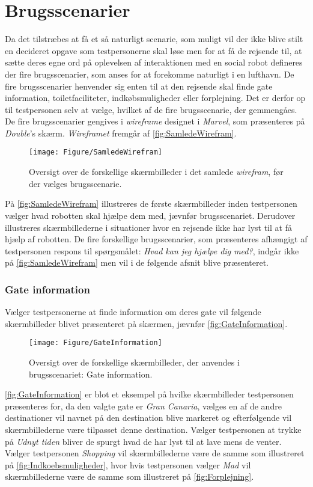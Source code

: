 \section{Brugsscenarier}
\label{ParametreBrugsscenarier}
%
Da det tilstræbes at få et så naturligt scenarie, som muligt vil der ikke blive stilt en decideret opgave som testpersonerne skal løse men for at få de rejsende til, at sætte deres egne ord på oplevelsen af interaktionen med en social robot defineres der fire brugsscenarier, som anses for at forekomme naturligt i en lufthavn. De fire brugsscenarier henvender sig enten til at den rejsende skal finde gate information, toiletfaciliteter, indkøbsmuligheder eller forplejning. Det er derfor op til testpersonen selv at vælge, hvilket af de fire brugsscenarie, der gemmengåes. De fire brugsscenarier gengives i \textit{wireframe} designet i \textit{Marvel}, som præsenteres på \textit{Double}'s skærm. \textit{Wireframet} fremgår af \autoref{fig:SamledeWirefram}.
%
\begin{figure}[H]
\centering
\texttt{[image: Figure/SamledeWirefram]} 
\caption{Oversigt over de forskellige skærmbilleder i det samlede \textit{wirefram}, før der vælges brugsscenarie.}
\label{fig:SamledeWirefram}
\end{figure}
\noindent
%
På \autoref{fig:SamledeWirefram} illustreres de første skærmbilleder inden testpersonen vælger hvad robotten skal hjælpe dem med, jævnfør brugsscenariet. Derudover illustreres skærmbillederne i situationer hvor en rejsende ikke har lyst til at få hjælp af robotten. De fire forskellige brugsscenarier, som præsenteres afhængigt af testpersonen respons til spørgsmålet: \textit{Hvad kan jeg hjælpe dig med?}, indgår ikke på \autoref{fig:SamledeWirefram} men vil i de følgende afsnit blive præsenteret. 
  

\subsubsection*{Gate information}
%
Vælger testpersonerne at finde information om deres gate vil følgende skærmbilleder blivet præsenteret på skærmen, jævnfør \autoref{fig:GateInformation}. 
%
\begin{figure}[H]
\centering
\texttt{[image: Figure/GateInformation]} 
\caption{Oversigt over de forskellige skærmbilleder, der anvendes i brugsscenariet: Gate information.}
\label{fig:GateInformation}
\end{figure}
\noindent
%
\autoref{fig:GateInformation} er blot et eksempel på hvilke skærmbilleder testpersonen præsenteres for, da den valgte gate er \textit{Gran Canaria}, vælges en af de andre destinationer vil navnet på den destination blive markeret og efterfølgende vil skærmbillederne være tilpasset denne destination. Vælger testpersonen at trykke på \textit{Udnyt tiden} bliver de spurgt hvad de har lyst til at lave mens de venter. Vælger testpersonen \textit{Shopping} vil skærmbillederne være de samme som illustreret på \autoref{fig:Indkoebsmuligheder}, hvor hvis testpersonen vælger \textit{Mad} vil skærmbillederne være de samme som illustreret på \autoref{fig:Forplejning}.  

